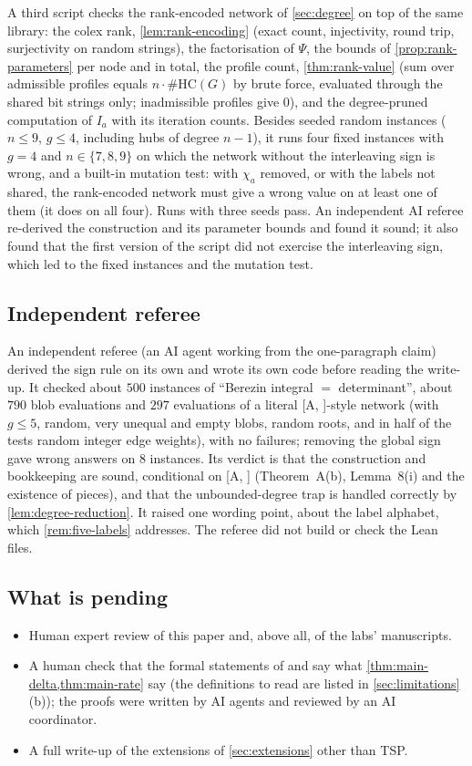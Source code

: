 \documentclass[11pt]{amsart}
\theoremstyle{plain}
\theoremstyle{definition}
\theoremstyle{remark}
\numberwithin{equation}{section}
\newcommand{\HC}{\#\mathrm{HC}}
\newcommand{\A}[1][]{\textup{[A\if\relax\detokenize{#1}\relax\else, #1\fi]}}
\begin{document}
A third script checks the rank-encoded network of \cref{sec:degree} on top of the same library:
the colex rank, \cref{lem:rank-encoding} (exact count, injectivity, round trip, surjectivity on
random strings), the factorisation of $\Psi$, the bounds of \cref{prop:rank-parameters} per node and
in total, the profile count, \cref{thm:rank-value} (sum over admissible profiles equals
$n\cdot\HC(G)$ by brute force, evaluated through the shared bit strings only; inadmissible
profiles give $0$), and the degree-pruned computation of $I_a$ with its iteration counts. Besides
seeded random instances ($n\le9$, $g\le4$, including hubs of degree $n-1$), it runs four fixed
instances with $g=4$ and $n\in\{7,8,9\}$ on which the network without the interleaving sign is
wrong, and a built-in mutation test: with $\chi_a$ removed, or with the labels not shared, the
rank-encoded network must give a wrong value on at least one of them (it does on all four). Runs
with three seeds pass. An independent AI referee re-derived the construction and its parameter
bounds and found it sound; it also found that the first version of the script did not exercise the
interleaving sign, which led to the fixed instances and the mutation test.

\subsection{Independent referee}
An independent referee (an AI agent working from the one-paragraph claim) derived the sign rule
on its own and wrote its own code before reading the write-up. It checked about $500$ instances of
``Berezin integral $=$ determinant'', about $790$ blob evaluations and $297$ evaluations of a
literal \A-style network (with $g\le5$, random, very unequal and empty blobs, random roots, and in
half of the tests random integer edge weights), with no failures; removing the global sign gave
wrong answers on $8$ instances. Its verdict is that the construction and bookkeeping are sound,
conditional on \A{} (Theorem~A(b), Lemma~8(i) and the existence of pieces), and that the
unbounded-degree trap is handled correctly by \cref{lem:degree-reduction}. It raised one wording
point, about the label alphabet, which \cref{rem:five-labels} addresses. The referee did not build
or check the Lean files.

\subsection{What is pending}
\begin{itemize}
\item Human expert review of this paper and, above all, of the labs' manuscripts.
\item A human check that the formal statements of  and  say what
\cref{thm:main-delta,thm:main-rate} say (the definitions to read are listed in
\cref{sec:limitations}(b)); the proofs were written by AI agents and reviewed by an AI
coordinator.
\item A full write-up of the extensions of \cref{sec:extensions} other than TSP.
\end{itemize}
\end{document}
